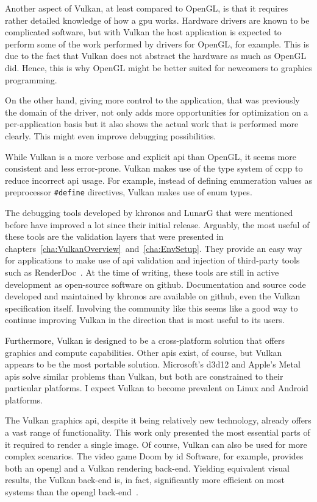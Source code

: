   Another aspect of Vulkan, at least compared to OpenGL, is that it requires rather detailed knowledge of how a \gls{gpu} works.
  Hardware drivers are known to be complicated software, but with Vulkan the host application is expected to perform some of the work performed by drivers for OpenGL, for example.
  This is due to the fact that Vulkan does not abstract the hardware as much as OpenGL did.
  Hence, this is why OpenGL might be better suited for newcomers to graphics programming.

  On the other hand, giving more control to the application, that was previously the domain of the driver, not only adds more opportunities for optimization on a per-application basis but it also shows the actual work that is performed more clearly.
  This might even improve debugging possibilities.

  While Vulkan is a more verbose and explicit \gls{api} than OpenGL, it seems more consistent and less error-prone.
  Vulkan makes use of the type system of \gls{ccpp} to reduce incorrect \gls{api} usage.
  For example, instead of defining enumeration values as preprocessor \lstinline{#define} directives, Vulkan makes use of enum types.

  The debugging tools developed by \gls{khronos} and LunarG that were mentioned before have improved a lot since their initial release.
  Arguably, the most useful of these tools are the validation layers that were presented in chapters~\ref{cha:VulkanOverview}~and~\ref{cha:EnvSetup}.
  They provide an easy way for applications to make use of \gls{api} validation and injection of third-party tools such as RenderDoc~\cite{renderdoc}.
  At the time of writing, these tools are still in active development as open-source software on \gls{github}.
  Documentation and source code developed and maintained by \gls{khronos} are available on \gls{github}, even the Vulkan specification itself.
  Involving the community like this seems like a good way to continue improving Vulkan in the direction that is most useful to its users.

  Furthermore, Vulkan is designed to be a cross-platform solution that offers graphics and compute capabilities.
  Other \glspl{api} exist, of course, but Vulkan appears to be the most portable solution.
  Microsoft's \gls{d3d12} and Apple's Metal \glspl{api} solve similar problems than Vulkan, but both are constrained to their particular platforms.
  I expect Vulkan to become prevalent on Linux and Android platforms.

  The Vulkan graphics \gls{api}, despite it being relatively new technology, already offers a vast range of functionality.
  This work only presented the most essential parts of it required to render a single image.
  Of course, Vulkan can also be used for more complex scenarios.
  The video game Doom by id Software, for example, provides both an \gls{opengl} and a Vulkan rendering back-end.
  Yielding equivalent visual results, the Vulkan back-end is, in fact, significantly more efficient on most systems than the \gls{opengl} back-end~\cite{eurogamer2016:doomvulkan}.

